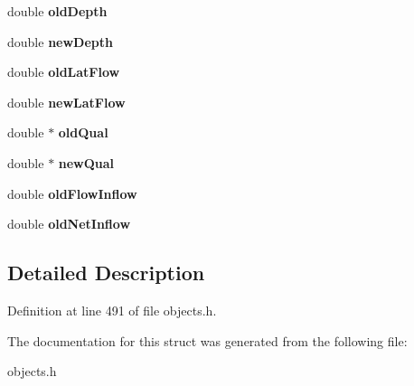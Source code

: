 \begin{DoxyCompactItemize}
double {\bfseries old\+Depth}
\item 
\mbox{\label{struct_t_node_a195aa9a02fdedc94e5d8e92aa782736e}} 
double {\bfseries new\+Depth}
\item 
\mbox{\label{struct_t_node_a27ed57e1d939e3132978c6ea872c1ecb}} 
double {\bfseries old\+Lat\+Flow}
\item 
\mbox{\label{struct_t_node_a6e0d60a2e7a809bc5940485c1cd37013}} 
double {\bfseries new\+Lat\+Flow}
\item 
\mbox{\label{struct_t_node_a2021ab3e0d06d6461e9a6c734c476edd}} 
double $\ast$ {\bfseries old\+Qual}
\item 
\mbox{\label{struct_t_node_ab4755cc5f84d582feddddc026135b667}} 
double $\ast$ {\bfseries new\+Qual}
\item 
\mbox{\label{struct_t_node_a5b740809e661ff025fd5a595f1031907}} 
double {\bfseries old\+Flow\+Inflow}
\item 
\mbox{\label{struct_t_node_a85b7a3d058133c8283dc293d7949f750}} 
double {\bfseries old\+Net\+Inflow}
\end{DoxyCompactItemize}


\subsection{Detailed Description}


Definition at line 491 of file objects.\+h.



The documentation for this struct was generated from the following file\+:\begin{DoxyCompactItemize}
\item 
objects.\+h\end{DoxyCompactItemize}
